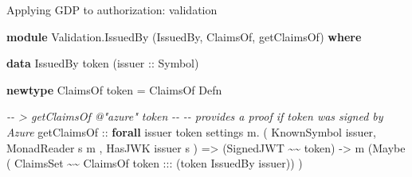 \documentclass[
  9pt,
  ignorenonframetext,
]{beamer}
\newenvironment{Shaded}{}{}
\newcommand{\CommentTok}[1]{\textcolor[rgb]{0.38,0.63,0.69}{\textit{#1}}}
\newcommand{\DataTypeTok}[1]{\textcolor[rgb]{0.56,0.13,0.00}{#1}}
\newcommand{\KeywordTok}[1]{\textcolor[rgb]{0.00,0.44,0.13}{\textbf{#1}}}
\newcommand{\NormalTok}[1]{#1}
\newcommand{\OperatorTok}[1]{\textcolor[rgb]{0.40,0.40,0.40}{#1}}
\newcommand{\OtherTok}[1]{\textcolor[rgb]{0.00,0.44,0.13}{#1}}
\begin{document}
\begin{frame}[fragile]{Applying GDP to authorization: validation}
\protect\hypertarget{applying-gdp-to-authorization-validation}{}
\begin{Shaded}
\begin{Highlighting}[]
\KeywordTok{module} \DataTypeTok{Validation.IssuedBy} 
\NormalTok{  (}\DataTypeTok{IssuedBy}\NormalTok{, }\DataTypeTok{ClaimsOf}\NormalTok{, getClaimsOf) }\KeywordTok{where}

\KeywordTok{data} \DataTypeTok{IssuedBy}\NormalTok{ token (}\OtherTok{issuer ::} \DataTypeTok{Symbol}\NormalTok{)}

\KeywordTok{newtype} \DataTypeTok{ClaimsOf}\NormalTok{ token }\OtherTok{=} \DataTypeTok{ClaimsOf} \DataTypeTok{Defn}

\CommentTok{{-}{-} \textgreater{} getClaimsOf @"azure" token}
\CommentTok{{-}{-} }
\CommentTok{{-}{-} provides a proof if token was signed by Azure}
\NormalTok{getClaimsOf}
\OtherTok{  ::} \KeywordTok{forall}\NormalTok{ issuer token settings m}\OperatorTok{.}
\NormalTok{      ( }\DataTypeTok{KnownSymbol}\NormalTok{ issuer, }\DataTypeTok{MonadReader}\NormalTok{ s m}
\NormalTok{      , }\DataTypeTok{HasJWK}\NormalTok{ issuer s}
\NormalTok{      )}
  \OtherTok{=\textgreater{}}\NormalTok{ (}\DataTypeTok{SignedJWT} \OperatorTok{\textasciitilde{}\textasciitilde{}}\NormalTok{ token)}
  \OtherTok{{-}\textgreater{}}\NormalTok{ m (}\DataTypeTok{Maybe}\NormalTok{ (}
      \DataTypeTok{ClaimsSet} \OperatorTok{\textasciitilde{}\textasciitilde{}} \DataTypeTok{ClaimsOf}\NormalTok{ token }\OperatorTok{:::}\NormalTok{ (token }\OtherTok{\textasciigrave{}IssuedBy\textasciigrave{}}\NormalTok{ issuer))}
\NormalTok{     )}
\end{Highlighting}
\end{Shaded}







\end{frame}
\end{document}
